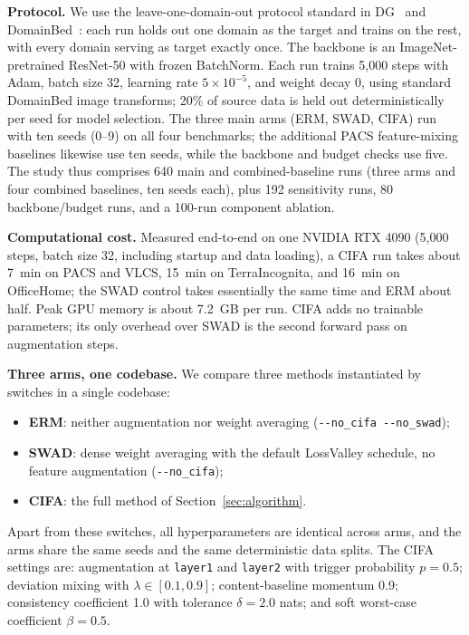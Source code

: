 \documentclass[electronics,article,submit,moreauthors]{Definitions/mdpi}
\begin{document}
\textbf{Protocol.} We use the leave-one-domain-out protocol standard in DG~\citep{ref45} and DomainBed~\citep{ref2}: each run holds out one domain as the target and trains on the rest, with every domain serving as target exactly once. The backbone is an ImageNet-pretrained ResNet-50 with frozen BatchNorm. Each run trains 5,000 steps with Adam, batch size 32, learning rate $5\times10^{-5}$, and weight decay 0, using standard DomainBed image transforms; 20\% of source data is held out deterministically per seed for model selection. The three main arms (ERM, SWAD, CIFA) run with ten seeds (0--9) on all four benchmarks; the additional PACS feature-mixing baselines likewise use ten seeds, while the backbone and budget checks use five. The study thus comprises 640 main and combined-baseline runs (three arms and four combined baselines, ten seeds each), plus 192 sensitivity runs, 80 backbone/budget runs, and a 100-run component ablation.

\textbf{Computational cost.} Measured end-to-end on one NVIDIA RTX 4090 (5{,}000 steps, batch size 32, including startup and data loading), a CIFA run takes about 7~min on PACS and VLCS, 15~min on TerraIncognita, and 16~min on OfficeHome; the SWAD control takes essentially the same time and ERM about half. Peak GPU memory is about 7.2~GB per run. CIFA adds no trainable parameters; its only overhead over SWAD is the second forward pass on augmentation steps.

\textbf{Three arms, one codebase.} We compare three methods instantiated by switches in a single codebase:
\begin{itemize}
\item \textbf{ERM}: neither augmentation nor weight averaging (\texttt{-{}-no\_cifa -{}-no\_swad});
\item \textbf{SWAD}: dense weight averaging with the default LossValley schedule, no feature augmentation (\texttt{-{}-no\_cifa});
\item \textbf{CIFA}: the full method of Section~\ref{sec:algorithm}.
\end{itemize}
Apart from these switches, all hyperparameters are identical across arms, and the arms share the same seeds and the same deterministic data splits. The CIFA settings are: augmentation at \texttt{layer1} and \texttt{layer2} with trigger probability $p=0.5$; deviation mixing with $\lambda\in[0.1,0.9]$; content-baseline momentum 0.9; consistency coefficient 1.0 with tolerance $\delta=2.0$ nats; and soft worst-case coefficient $\beta=0.5$.
\end{document}
